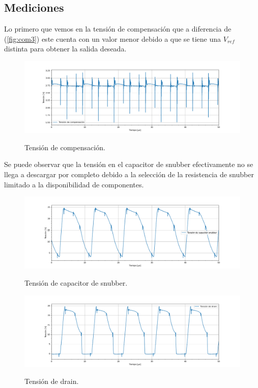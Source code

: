 \subsection{Mediciones}
Lo primero que vemos en la tensión de compensación que a diferencia de (\ref{fig:com3}) este cuenta con un valor menor debido a que se tiene una $V_{ref}$ distinta para obtener la salida deseada.
\begin{figure}[H]
	\centering
	\includegraphics[width=0.9\linewidth]{ImagenesParteIV/Vcom.png}
	\label{fig:vcom_4}
	\caption{Tensión de compensación.}
\end{figure}
Se puede observar que la tensión en el capacitor de snubber efectivamente no se llega a descargar por completo debido a la selección de la resistencia de snubber limitado a la disponibilidad de componentes.
\begin{figure}[H]
	\centering
	\includegraphics[width=0.9\linewidth]{ImagenesParteIV/Vcsnubber.png}
	\label{fig:vcsnubb_4}
	\caption{Tensión de capacitor de snubber.}
\end{figure}

\begin{figure}[H]
	\centering
	\includegraphics[width=0.9\linewidth]{ImagenesParteIV/Vds.png}
	\label{fig:vds_4}
	\caption{Tensión de drain.}
\end{figure}

